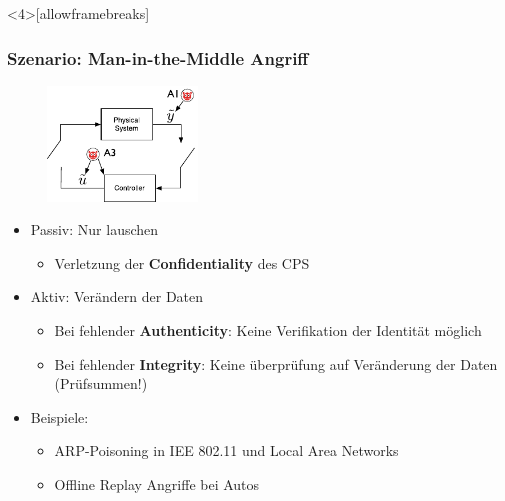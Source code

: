 \documentclass{sikslides}
\begin{document}
    \begin{frame}
        <4>[allowframebreaks]
        \frametitle{Szenario: Man-in-the-Middle Angriff}
        \begin{figure}
            \centering
            \includegraphics[width=4cm]{figure/mitm}
        \end{figure}
        \begin{itemize}
            \item Passiv: Nur lauschen
            \begin{itemize}
                \item Verletzung der \textbf{Confidentiality} des CPS
            \end{itemize}
            \item Aktiv: Verändern der Daten
            \begin{itemize}
                \item Bei fehlender \textbf{Authenticity}: Keine Verifikation der Identität möglich
                \item Bei fehlender \textbf{Integrity}: Keine überprüfung auf Veränderung der Daten (Prüfsummen!)
            \end{itemize}
        \end{itemize}
        \framebreak
        \begin{itemize}
            \item Beispiele:
            \begin{itemize}
                \item ARP-Poisoning in IEE 802.11 und Local Area Networks
                \item Offline Replay Angriffe bei Autos
            \end{itemize}
        \end{itemize}
    \end{frame}
\end{document}
